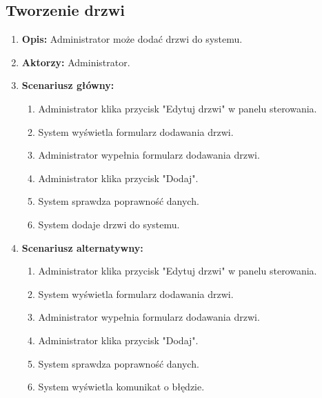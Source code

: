 \subsection{Tworzenie drzwi}
\begin{enumerate}
    \item \textbf{Opis:} Administrator może dodać drzwi do systemu.
    \item \textbf{Aktorzy:} Administrator.
    \item \textbf{Scenariusz główny:} 
    \begin{enumerate}
        \item Administrator klika przycisk "Edytuj drzwi" w panelu sterowania.
        \item System wyświetla formularz dodawania drzwi.
        \item Administrator wypełnia formularz dodawania drzwi.
        \item Administrator klika przycisk "Dodaj".
        \item System sprawdza poprawność danych.
        \item System dodaje drzwi do systemu.
    \end{enumerate}
    \item \textbf{Scenariusz alternatywny:} 
    \begin{enumerate}
        \item Administrator klika przycisk "Edytuj drzwi" w panelu sterowania.
        \item System wyświetla formularz dodawania drzwi.
        \item Administrator wypełnia formularz dodawania drzwi.
        \item Administrator klika przycisk "Dodaj".
        \item System sprawdza poprawność danych.
        \item System wyświetla komunikat o błędzie.
    \end{enumerate}
\end{enumerate}

